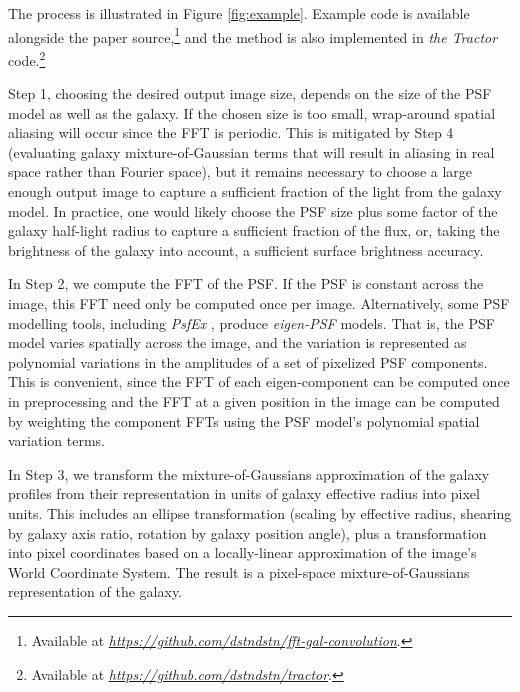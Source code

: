 \documentclass[11pt,letterpaper]{aastex63}
\newcommand{\niceurl}[1]{\href{#1}{\textsl{#1}}}
\newcommand{\project}[1]{\textsl{#1}}
\begin{document}
The process is illustrated in Figure \ref{fig:example}.  Example code
is available alongside the paper source,\footnote{ Available at
  \niceurl{https://github.com/dstndstn/fft-gal-convolution}.}  and the
method is also implemented in \project{the Tractor} code.\footnote{%
  Available at
  \niceurl{https://github.com/dstndstn/tractor}.}

Step 1, choosing the desired output image size, depends on the size of
the PSF model as well as the galaxy.  If the chosen size is too small,
wrap-around spatial aliasing will occur since the FFT is periodic.
This is mitigated by Step 4 (evaluating galaxy mixture-of-Gaussian
terms that will result in aliasing in real space rather than Fourier
space), but it remains necessary to choose a large enough output image
to capture a sufficient fraction of the light from the galaxy model.
In practice, one would likely choose the PSF size plus some factor of
the galaxy half-light radius to capture a sufficient fraction of the
flux, or, taking the brightness of the galaxy into account, a
sufficient surface brightness accuracy.

In Step 2, we compute the FFT of the PSF.  If the PSF is constant
across the image, this FFT need only be computed once per image.
Alternatively, some PSF modelling tools, including \project{PsfEx}
\citep{psfex}, produce \emph{eigen-PSF} models.  That is, the PSF
model varies spatially across the image, and the variation is
represented as polynomial variations in the amplitudes of a set of
pixelized PSF components.  This is convenient, since the FFT of each
eigen-component can be computed once in preprocessing and the FFT at a
given position in the image can be computed by weighting the component
FFTs using the PSF model's polynomial spatial variation terms.

In Step 3, we transform the mixture-of-Gaussians approximation of the
galaxy profiles from their representation in units of galaxy effective
radius into pixel units.  This includes an ellipse transformation
(scaling by effective radius, shearing by galaxy axis ratio, rotation
by galaxy position angle), plus a transformation into pixel
coordinates based on a locally-linear approximation of the image's
World Coordinate System.
The result is a pixel-space mixture-of-Gaussians representation of the
galaxy.
\end{document}
